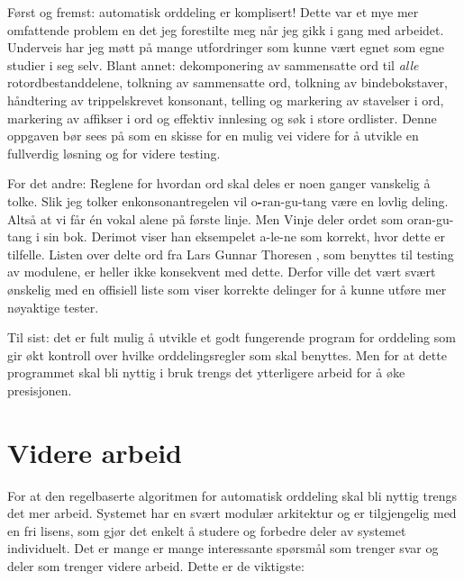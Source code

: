Først og fremst: automatisk orddeling er komplisert! Dette var et mye mer omfattende problem en det jeg forestilte meg når jeg gikk i gang med arbeidet. Underveis har jeg møtt på mange utfordringer som kunne vært egnet som egne studier i seg selv. Blant annet: dekomponering av sammensatte ord til \textit{alle} rotordbestanddelene, tolkning av sammensatte ord, tolkning av bindebokstaver, håndtering av trippelskrevet konsonant, telling og markering av stavelser i ord, markering av affikser i ord og effektiv innlesing og søk i store ordlister. Denne oppgaven bør sees på som en skisse for en mulig vei videre for å utvikle en fullverdig løsning og for videre testing.

For det andre: Reglene for hvordan ord skal deles er noen ganger vanskelig å tolke. Slik jeg tolker enkonsonantregelen vil o\textbf{-}ran-gu-tang være en lovlig deling. Altså at vi får én vokal alene på første linje. Men Vinje deler ordet som oran-gu-tang i sin bok. Derimot viser han eksempelet a-le-ne som korrekt, hvor dette er tilfelle. Listen over delte ord fra Lars Gunnar Thoresen \cite{thoresen1993virtuelle}, som benyttes til testing av modulene, er heller ikke konsekvent med dette. Derfor ville det vært svært ønskelig med en offisiell liste som viser korrekte delinger for å kunne utføre mer nøyaktige tester.

Til sist: det er fult mulig å utvikle et godt fungerende program for orddeling som gir økt kontroll over hvilke orddelingsregler som skal benyttes. Men for at dette programmet skal bli nyttig i bruk trengs det ytterligere arbeid for å øke presisjonen.


\section{Videre arbeid}
\label{sec:videre-arbeid}

For at den regelbaserte algoritmen for automatisk orddeling skal bli nyttig trengs det mer arbeid. Systemet har en svært modulær arkitektur og er tilgjengelig med en fri lisens, som gjør det enkelt å studere og forbedre deler av systemet individuelt. Det er mange er mange interessante spørsmål som trenger svar og deler som trenger videre arbeid. Dette er de viktigste:

